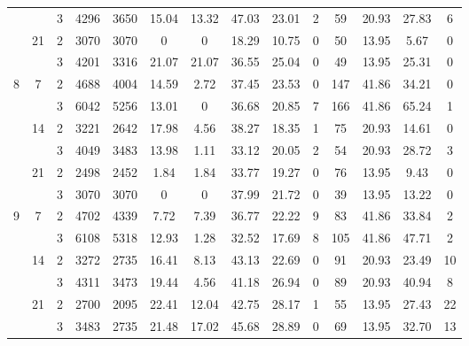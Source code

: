 \begin{tabular}{|ccc|ccc|ccc|ccc|c|c|}
  &    & 3 &  4296 &   3650 & 15.04 &   13.32 &   47.03 &   23.01 &    2 &   59 &   20.93 & 27.83 &     6 \\
\cline{2-14}
  & \multirow{2}{*}{21} & 2 &  3070 &   3070 &  0 &    0 &   18.29 &   10.75 &    0 &   50 &   13.95 &  5.67 &     0 \\
  &    & 3 &  4201 &   3316 & 21.07 &   21.07 &   36.55 &   25.04 &    0 &   49 &   13.95 & 25.31 &     0 \\
\cline{1-14}
\cline{2-14}
\multirow{6}{*}{8} & \multirow{2}{*}{7} & 2 &  4688 &   4004 & 14.59 &    2.72 &   37.45 &   23.53 &    0 &  147 &   41.86 & 34.21 &     0 \\
  &    & 3 &  6042 &   5256 & 13.01 &    0 &   36.68 &   20.85 &    7 &  166 &   41.86 & 65.24 &     1 \\
\cline{2-14}
  & \multirow{2}{*}{14} & 2 &  3221 &   2642 & 17.98 &    4.56 &   38.27 &   18.35 &    1 &   75 &   20.93 & 14.61 &     0 \\
  &    & 3 &  4049 &   3483 & 13.98 &    1.11 &   33.12 &   20.05 &    2 &   54 &   20.93 & 28.72 &     3 \\
\cline{2-14}
  & \multirow{2}{*}{21} & 2 &  2498 &   2452 &  1.84 &    1.84 &   33.77 &   19.27 &    0 &   76 &   13.95 &  9.43 &     0 \\
  &    & 3 &  3070 &   3070 &  0 &    0 &   37.99 &   21.72 &    0 &   39 &   13.95 & 13.22 &     0 \\
\cline{1-14}
\cline{2-14}
\multirow{6}{*}{9} & \multirow{2}{*}{7} & 2 &  4702 &   4339 &  7.72 &    7.39 &   36.77 &   22.22 &    9 &   83 &   41.86 & 33.84 &     2 \\
  &    & 3 &  6108 &   5318 & 12.93 &    1.28 &   32.52 &   17.69 &    8 &  105 &   41.86 & 47.71 &     2 \\
\cline{2-14}
  & \multirow{2}{*}{14} & 2 &  3272 &   2735 & 16.41 &    8.13 &   43.13 &   22.69 &    0 &   91 &   20.93 & 23.49 &    10 \\
  &    & 3 &  4311 &   3473 & 19.44 &    4.56 &   41.18 &   26.94 &    0 &   89 &   20.93 & 40.94 &     8 \\
\cline{2-14}
  & \multirow{2}{*}{21} & 2 &  2700 &   2095 & 22.41 &   12.04 &   42.75 &   28.17 &    1 &   55 &   13.95 & 27.43 &    22 \\
  &    & 3 &  3483 &   2735 & 21.48 &   17.02 &   45.68 &   28.89 &    0 &   69 &   13.95 & 32.70 &    13 \\
\bottomrule
\end{tabular}
